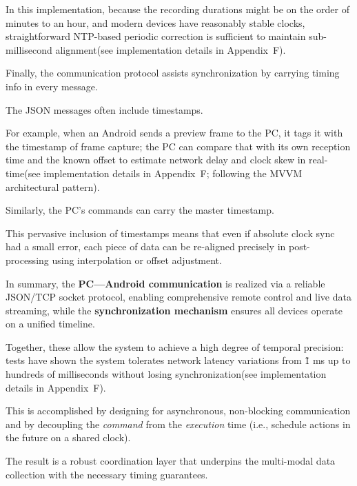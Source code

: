In this implementation, because the recording durations might be on the order of minutes to an hour, and modern devices have reasonably stable clocks, straightforward NTP-based periodic correction is sufficient to maintain sub-millisecond alignment(see implementation details in Appendix~F).

Finally, the communication protocol assists synchronization by carrying timing info in every message.

The JSON messages often include timestamps.

For example, when an Android sends a preview frame to the PC, it tags it with the timestamp of frame capture; the PC can compare that with its own reception time and the known offset to estimate network delay and clock skew in real-time(see implementation details in Appendix~F; following the MVVM architectural pattern).

Similarly, the PC's commands can carry the master timestamp.

This pervasive inclusion of timestamps means that even if absolute clock sync had a small error, each piece of data can be re-aligned precisely in post-processing using interpolation or offset adjustment.

In summary, the \textbf{PC---Android communication}
 is realized via a reliable JSON/TCP socket protocol, enabling comprehensive remote control and live data streaming, while the \textbf{synchronization mechanism}
 ensures all devices operate on a unified timeline.

Together, these allow the system to achieve a high degree of temporal precision: tests have shown the system tolerates network latency variations from \~1 ms up to hundreds of milliseconds without losing synchronization(see implementation details in Appendix~F).

This is accomplished by designing for asynchronous, non-blocking communication and by decoupling the \textit{command} from the \textit{execution} time (i.e., schedule actions in the future on a shared clock).

The result is a robust coordination layer that underpins the multi-modal data collection with the necessary timing guarantees.

